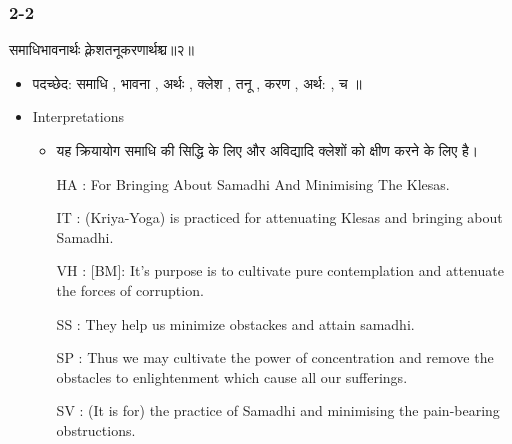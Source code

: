 \begin{frame}[fragile]\frametitle{2-2}
\begin{sanskrit}
समाधिभावनार्थः क्लेशतनूकरणार्थश्च॥२॥
\end{sanskrit}

	\begin{itemize}
	\item पदच्छेद: समाधि , भावना , अर्थः , क्लेश , तनू , करण , अर्थ: , च ॥
	\item Interpretations
		\begin{itemize}
		\item यह क्रियायोग समाधि की सिद्धि के लिए और अविद्यादि क्लेशों को क्षीण करने के लिए है।
		\item [HA]: For Bringing About Samadhi And Minimising The Klesas.
		\item [IT]: (Kriya-Yoga) is practiced for attenuating Klesas and bringing about Samadhi.
		\item [VH]: [BM]: It’s purpose is to cultivate pure contemplation and attenuate the forces of corruption.
		\item [SS]: They help us minimize obstackes and attain samadhi.
		\item [SP]: Thus we may cultivate the power of concentration and remove the obstacles to enlightenment which cause all our sufferings.
		\item [SV]: (It is for) the practice of Samadhi and minimising the pain-bearing obstructions. 
		\end{itemize}
	\end{itemize}
	
\end{frame}



